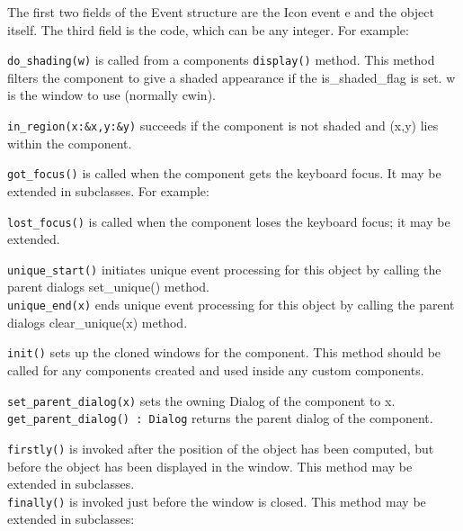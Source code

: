 The first two fields of the Event structure are the Icon event e and the
object itself. The third field is the code, which can be any integer.
For example:


\texttt{do\_shading(w)} is called from a component{\textquotesingle}s
\texttt{display()}
method. This method filters the component to give a shaded appearance
if the is\_shaded\_flag is set. w is the window to use (normally cwin).

\texttt{in\_region(x:\&x,y:\&y)} succeeds if the component is not shaded and
(x,y) lies within the component.

\texttt{got\_focus()} is called when the component gets the keyboard focus. It
may be extended in subclasses. For example:


\texttt{lost\_focus()} is called when the component loses the keyboard focus; it
may be extended.

\texttt{unique\_start()} initiates unique event processing for this object by
calling the parent dialog{\textquotesingle}s set\_unique()
method.\\
\texttt{unique\_end(x)} ends unique event processing for this object by calling
the parent dialog{\textquotesingle}s clear\_unique(x) method.

\texttt{init()} sets up the cloned windows for the component. This method should
be called for any components created and used inside any custom
components.

\texttt{set\_parent\_dialog(x)} sets the owning Dialog of the component to
x.\\
\texttt{get\_parent\_dialog() : Dialog} returns the parent dialog of the
component.

\texttt{firstly()} is invoked after the position of the object has been
computed,
but before the object has been displayed in the window. This method may
be extended in subclasses.\\
\texttt{finally()} is invoked just before the window is closed. This method may
be extended in subclasses:


